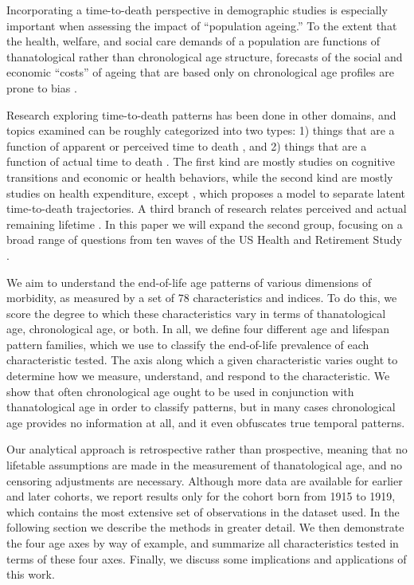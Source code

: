 \documentclass[11pt,oneside]{article} %
\begin{document}
Incorporating a time-to-death perspective in demographic studies is especially
important when assessing the impact of ``population ageing.''
To the extent that the health, welfare, and social care demands of a
population are functions of thanatological rather than chronological age
structure, forecasts of the social and economic ``costs'' of ageing that are
based only on chronological age profiles are prone to bias
\citep{stearns2004time}.

Research exploring time-to-death patterns has been done in other
domains, and topics examined can be roughly categorized into two types: 1)
things that are a function of apparent or perceived time to death
\citep{hamermesh1985expectations,hurd1995evaluation,carstensen2006influence,gan2004subjective,biro2010subjective,salm2010subjective,van2010living,cocco2012longevity,payne2013life,balia2013survival},
and 2) things that are a function of actual time to death
\citep{miller2001increasing,seshamani2004longitudinal,werblow2007population,
wolf2015disability,stearns2004time}.
The first kind are mostly studies on cognitive transitions and economic or
health behaviors, while the second kind are mostly studies on health
expenditure, except \citet{wolf2015disability}, which proposes a model to
separate latent time-to-death trajectories.
A third branch of research relates perceived and actual remaining lifetime
\citep{perozek2008using,delavande2011differential,post2012longevity,kutlu2013individuals}.
In this paper we will expand the second group, focusing on a broad range of
questions from ten waves of the US Health and Retirement Study \citep{HRS}.

We aim to understand the end-of-life age patterns of various dimensions of
morbidity, as measured by a set of 78 characteristics and indices. To do this,
we score the degree to which these characteristics vary in terms of thanatological
age, chronological age, or both. In all, we define four different age and
lifespan pattern families, which we use to classify the end-of-life prevalence
of each characteristic tested. The axis along which a given characteristic varies ought
to determine how we measure, understand, and respond to the characteristic. We show that often chronological age ought to be used in conjunction with
thanatological age in order to classify patterns, but in many cases
chronological age provides no information at all, and it even obfuscates true temporal
patterns.

Our analytical approach is retrospective rather than
prospective, meaning that no lifetable assumptions are made in the measurement
of thanatological age, and no censoring adjustments are necessary. Although more
data are available for earlier and later cohorts, we report results only for the
cohort born from 1915 to 1919, which contains the most extensive set of observations in
the dataset used. In the following section we describe the methods in
greater detail. We then demonstrate the four age axes by way of example,
and summarize all characteristics tested in terms of these four axes. Finally,
we discuss some implications and applications of this work.
\end{document}
